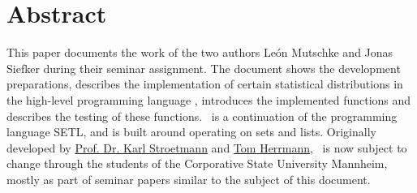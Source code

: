 
\chapter*{Abstract}

	This paper documents the work of the two authors Le\'{o}n Mutschke and Jonas Siefker during their seminar assignment. The document shows the development preparations, describes the implementation of certain statistical distributions in the high-level programming language \setlx, introduces the implemented functions and describes the testing of these functions. \setlx\ is a continuation of the programming language SETL, and is built around operating on sets and lists. Originally developed by \href{https://github.com/karlstroetmann}{Prof. Dr. Karl Stroetmann} and \href{https://github.com/herrmanntom}{Tom Herrmann}, \setlx\ is now subject to change through the students of the Corporative State University Mannheim, mostly as part of seminar papers similar to the subject of this document.